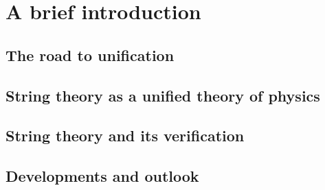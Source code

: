 \documentclass[12pt]{report}
\begin{document}
\chapter{A brief introduction}
\newpage
\section{The road to unification}
\section{String theory as a unified theory of physics}
\section{String theory and its verification}
\section{Developments and outlook}
\end{document}
